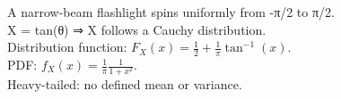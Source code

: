 \documentclass[preview]{standalone}
\begin{document}
A narrow-beam flashlight spins uniformly from -π/2 to π/2.\\X = tan(θ) ⇒ X follows a Cauchy distribution.\\Distribution function: $F_X(x) = \tfrac12 + \tfrac{1}{\pi}\tan^{-1}(x)$.\\PDF: $f_X(x) = \tfrac{1}{\pi}\tfrac{1}{1+x^2}.$\\Heavy-tailed: no defined mean or variance.\\
\end{document}
